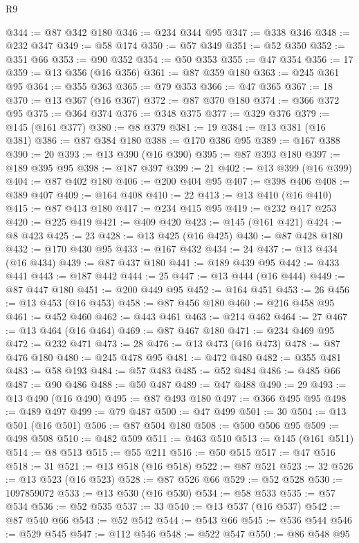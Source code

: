 \begin{lexlean}{R9}
\begin{coremodule}
@344 := @87 @342 @180
@346 := @234 @344 @95
@347 := @338 @346
@348 := @232 @347
@349 := @58 @174
@350 := @57 @349
@351 := @52 @350
@352 := @351 @66
@353 := @90 @352
@354 := @50 @353
@355 := @47 @354
@356 := 17
@359 := @13 @356 (@16 @356)
@361 := @87 @359 @180
@363 := @245 @361 @95
@364 := @355 @363
@365 := @79 @353
@366 := @47 @365
@367 := 18
@370 := @13 @367 (@16 @367)
@372 := @87 @370 @180
@374 := @366 @372 @95
@375 := @364 @374
@376 := @348 @375
@377 := @329 @376
@379 := @145 (@161 @377)
@380 := @8 @379
@381 := 19
@384 := @13 @381 (@16 @381)
@386 := @87 @384 @180
@388 := @170 @386 @95
@389 := @167 @388
@390 := 20
@393 := @13 @390 (@16 @390)
@395 := @87 @393 @180
@397 := @189 @395 @95
@398 := @187 @397
@399 := 21
@402 := @13 @399 (@16 @399)
@404 := @87 @402 @180
@406 := @200 @404 @95
@407 := @398 @406
@408 := @389 @407
@409 := @164 @408
@410 := 22
@413 := @13 @410 (@16 @410)
@415 := @87 @413 @180
@417 := @234 @415 @95
@419 := @232 @417 @253
@420 := @225 @419
@421 := @409 @420
@423 := @145 (@161 @421)
@424 := @8 @423
@425 := 23
@428 := @13 @425 (@16 @425)
@430 := @87 @428 @180
@432 := @170 @430 @95
@433 := @167 @432
@434 := 24
@437 := @13 @434 (@16 @434)
@439 := @87 @437 @180
@441 := @189 @439 @95
@442 := @433 @441
@443 := @187 @442
@444 := 25
@447 := @13 @444 (@16 @444)
@449 := @87 @447 @180
@451 := @200 @449 @95
@452 := @164 @451
@453 := 26
@456 := @13 @453 (@16 @453)
@458 := @87 @456 @180
@460 := @216 @458 @95
@461 := @452 @460
@462 := @443 @461
@463 := @214 @462
@464 := 27
@467 := @13 @464 (@16 @464)
@469 := @87 @467 @180
@471 := @234 @469 @95
@472 := @232 @471
@473 := 28
@476 := @13 @473 (@16 @473)
@478 := @87 @476 @180
@480 := @245 @478 @95
@481 := @472 @480
@482 := @355 @481
@483 := @58 @193
@484 := @57 @483
@485 := @52 @484
@486 := @485 @66
@487 := @90 @486
@488 := @50 @487
@489 := @47 @488
@490 := 29
@493 := @13 @490 (@16 @490)
@495 := @87 @493 @180
@497 := @366 @495 @95
@498 := @489 @497
@499 := @79 @487
@500 := @47 @499
@501 := 30
@504 := @13 @501 (@16 @501)
@506 := @87 @504 @180
@508 := @500 @506 @95
@509 := @498 @508
@510 := @482 @509
@511 := @463 @510
@513 := @145 (@161 @511)
@514 := @8 @513
@515 := @55 @211
@516 := @50 @515
@517 := @47 @516
@518 := 31
@521 := @13 @518 (@16 @518)
@522 := @87 @521
@523 := 32
@526 := @13 @523 (@16 @523)
@528 := @87 @526 @66
@529 := @52 @528
@530 := 1097859072
@533 := @13 @530 (@16 @530)
@534 := @58 @533
@535 := @57 @534
@536 := @52 @535
@537 := 33
@540 := @13 @537 (@16 @537)
@542 := @87 @540 @66
@543 := @52 @542
@544 := @543 @66
@545 := @536 @544
@546 := @529 @545
@547 := @112 @546
@548 := @522 @547
@550 := @86 @548 @95

\end{coremodule}
\end{lexlean}
